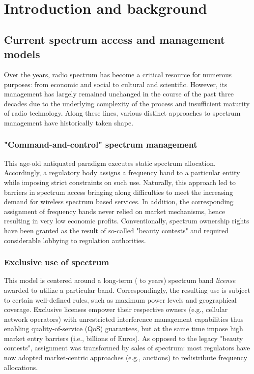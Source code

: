 \documentclass[journal]{IEEEtran}
\begin{document}
\section{Introduction and background}

\subsection{Current spectrum access and management models}

Over the years, radio spectrum has become a critical resource for numerous purposes: from economic and social to cultural and scientific. However, its management has largely remained unchanged in the course of the past three decades due to the underlying complexity of the process and insufficient maturity of radio technology. Along these lines, various distinct approaches to spectrum management have historically taken shape.

\subsubsection{"Command-and-control" spectrum management} This age-old antiquated paradigm executes static spectrum allocation. Accordingly, a regulatory body assigns a frequency band to a particular entity while imposing strict constraints on such use. Naturally, this approach led to barriers in spectrum access bringing along difficulties to meet the increasing demand for wireless spectrum based services. In addition, the corresponding assignment of frequency bands never relied on market mechanisms, hence resulting in very low economic profits. Conventionally, spectrum ownership rights have been granted as the result of so-called "beauty contests" and required considerable lobbying to regulation authorities.

\subsubsection{Exclusive use of spectrum} This model is centered around a long-term ( to  years) spectrum band \textit{license} awarded to utilize a particular band. Correspondingly, the resulting use is subject to certain well-defined rules, such as maximum power levels and geographical coverage. Exclusive licenses empower their respective owners (e.g., cellular network operators) with unrestricted interference management capabilities thus enabling quality-of-service (QoS) guarantees, but at the same time impose high market entry barriers (i.e., billions of Euros). As opposed to the legacy "beauty contests", assignment was transformed by sales of spectrum: most regulators have now adopted market-centric approaches (e.g., auctions) to redistribute frequency allocations.
\end{document}
